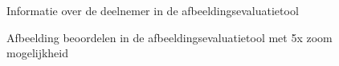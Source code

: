 \FloatBarrier
\begin{figure}[h!]
	\caption{Informatie over de deelnemer in de \gls{afbeeldingsevaluatietool}}
	\label{fig:bijlages-screenshot-afbeeldingsevaluatietool-over-u}
\end{figure}
\FloatBarrier

\FloatBarrier
\begin{figure}[h!]
	\caption{Afbeelding beoordelen in de \gls{afbeeldingsevaluatietool} met 5x zoom mogelijkheid}
	\label{fig:bijlages-screenshot-afbeeldingsevaluatietool-evalutie}
\end{figure}
\FloatBarrier